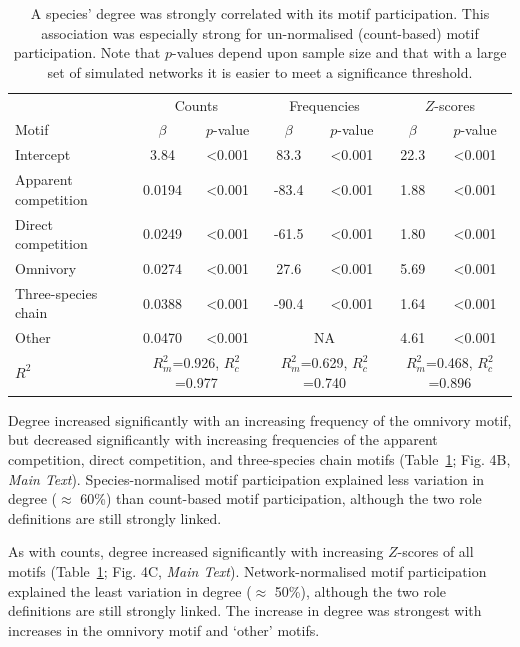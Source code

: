 \documentclass[12pt]{article}
\begin{document}
\begin{spacing}{2.0}
			\begin{table}[hb!]
    			\caption{A species' degree was strongly correlated with its motif participation. This association was especially strong for un-normalised (count-based) motif participation. Note that $p$-values depend upon sample size and that with a large set of simulated networks it is easier to meet a significance threshold.}
    			\label{tab:motifs_vs_deg}
    			\begin{tabular}{l | c c | c c | c c}
    			& \multicolumn{2}{c|}{Counts} & \multicolumn{2}{c}{Frequencies} & \multicolumn{2}{|c}{$Z$-scores} \\
    			Motif & $\beta$ & $p$-value & $\beta$ & $p$-value & $\beta$ & $p$-value \\
    			\hline
    			Intercept &  3.84  & \textless0.001 & 83.3 & \textless0.001 & 22.3 & \textless0.001\\
    			\hline
    			Apparent competition       &  0.0194  & \textless0.001 & -83.4 & \textless0.001 & 1.88 & \textless0.001 \\
    			Direct competition       &  0.0249  & \textless0.001 & -61.5 & \textless0.001 & 1.80 & \textless0.001\\
    			Omnivory       &  0.0274  & \textless0.001 & 27.6 & \textless0.001 & 5.69 & \textless0.001\\
    			Three-species chain       &  0.0388  & \textless0.001 & -90.4 & \textless0.001 & 1.64 & \textless0.001\\
    			Other    &  0.0470  & \textless0.001 & \multicolumn{2}{c|}{NA} & 4.61 & \textless0.001 \\
    			\hline
    			$R^2$ & \multicolumn{2}{c|}{\tiny{$R^2_m$=0.926, $R^2_c$=0.977}} & \multicolumn{2}{c}{\tiny{$R^2_m$=0.629, $R^2_c$=0.740}} & \multicolumn{2}{|c}{\tiny{$R^2_m$=0.468, $R^2_c$=0.896}} \\
    			\end{tabular}
    			\end{table}


			Degree increased significantly with an increasing frequency of the omnivory motif, but decreased significantly with increasing frequencies of the apparent competition, direct competition, and three-species chain motifs (Table~\ref{tab:motifs_vs_deg}; Fig. 4B, \emph{Main Text}).
			Species-normalised motif participation explained less variation in degree ($\approx$ 60\%) than count-based motif participation, although the two role definitions are still strongly linked.


			As with counts, degree increased significantly with increasing $Z$-scores of all motifs (Table~\ref{tab:motifs_vs_deg}; Fig. 4C, \emph{Main Text}).
			Network-normalised motif participation explained the least variation in degree ($\approx$ 50\%), although the two role definitions are still strongly linked.
			The increase in degree was strongest with increases in the omnivory motif and `other' motifs.



\end{spacing}
\end{document}
